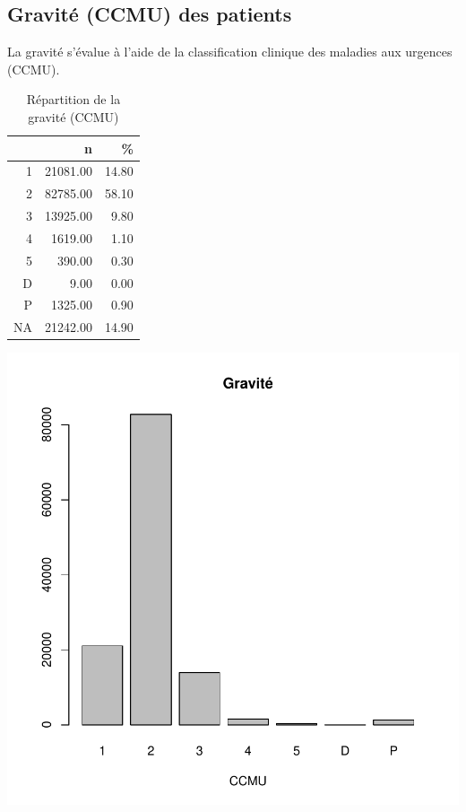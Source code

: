 \documentclass[12pt,english,french]{report}
\begin{document}
%
%
\subsection{Gravité (CCMU) des patients}

La gravité s'évalue à l'aide de la classification clinique des maladies aux urgences (CCMU).
\begin{table}[ht]
\centering
\begin{tabular}{rrr}
  \hline
 & n & \% \\ 
  \hline
1 & 21081.00 & 14.80 \\ 
  2 & 82785.00 & 58.10 \\ 
  3 & 13925.00 & 9.80 \\ 
  4 & 1619.00 & 1.10 \\ 
  5 & 390.00 & 0.30 \\ 
  D & 9.00 & 0.00 \\ 
  P & 1325.00 & 0.90 \\ 
  NA & 21242.00 & 14.90 \\ 
   \hline
\end{tabular}
\caption{Répartition de la gravité (CCMU)} 
\label{ccmu}
\end{table}\includegraphics{rpu2012-gravite1}
\appendix
\end{document}
